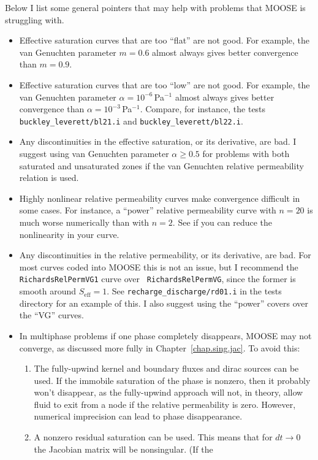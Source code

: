 \documentclass[]{scrreprt}
\begin{document}
Below I list some general pointers that may help with problems that
MOOSE is struggling with.
\begin{itemize}
\item Effective saturation curves that are too ``flat'' are not good.
  For example, the van Genuchten parameter $m=0.6$ almost always gives
  better convergence than $m=0.9$.
\item Effective saturation curves that are too ``low'' are not good.
  For example, the van Genuchten parameter $\alpha=10^{-6}$\,Pa$^{-1}$
  almost always gives better convergence than
  $\alpha=10^{-3}$\,Pa$^{-1}$.  Compare, for instance, the tests {\tt
    buckley\_leverett/bl21.i} and {\tt buckley\_leverett/bl22.i}.
\item Any discontinuities in the effective saturation, or its
  derivative, are bad.  I suggest using van Genuchten parameter
  $\alpha\geq 0.5$ for problems with both saturated and unsaturated
  zones if the van Genuchten relative permeability relation is used.
\item Highly nonlinear relative permeability curves make convergence
  difficult in some cases.  For instance, a ``power'' relative
  permeability curve with $n=20$ is much worse numerically than with
  $n=2$.  See if you can reduce the nonlinearity in your curve.
\item Any discontinuities in the relative permeability, or its derivative,
  are bad.  For most curves coded into MOOSE this is not an issue, but
  I recommend the {\tt RichardsRelPermVG1} curve over {\tt
    RichardsRelPermVG}, since the former is smooth around
  $S_{\mathrm{eff}}=1$.  See {\tt recharge\_discharge/rd01.i} in the
  tests directory for an example of this.   I also suggest using the
  ``power'' covers over the ``VG'' curves.
\item In multiphase problems if one phase completely disappears, MOOSE
  may not converge, as discussed more fully in
  Chapter~\ref{chap.sing.jac}.  To avoid this: 
\begin{enumerate}
\item The fully-upwind kernel and boundary fluxes and dirac sources
  can be used.  If the immobile saturation of the phase is nonzero,
  then it probably won't disappear, as the fully-upwind approach will
  not, in theory, allow fluid to exit from a node if the relative
  permeability is zero.  However, numerical imprecision can lead to
  phase disappearance.
\item A nonzero residual saturation can be used.  This means that for
  $dt\rightarrow 0$ the Jacobian matrix will be nonsingular.  (If the

\end{enumerate}
\end{itemize}
\end{document}
